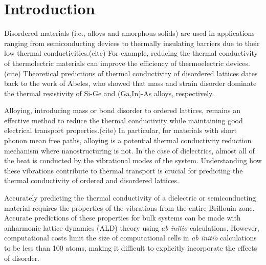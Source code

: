 \documentclass[aps,prb,onecolumn,preprint,superscriptaddress,amsmath,amssymb,floatfix]{revtex4}
\begin{document}
\section{\label{S:Introduction}Introduction}

Disordered materials (i.e., alloys and amorphous solids) are used in 
applications ranging from semiconducting devices to thermally insulating  
barriers due to their low thermal conductivities.(cite) 
For example, reducing 
the thermal conductivity of thermolectric materials can improve the 
efficiency of thermoelectric devices.(cite)  
Theoretical predictions of thermal conductivity of disordered 
lattices dates back to 
the work of Abeles, who showed that mass and strain 
disorder dominate the thermal resistivity of Si-Ge and 
(Ga,In)-As alloys, respectively.\cite{abeles_lattice_1963} 

Alloying, introducing mass or bond disorder to ordered lattices, 
remains an effective method to reduce the thermal conductivity 
while maintaining good electrical transport properties.(cite) 
In particular, for materials with short phonon mean free paths, 
alloying is a potential thermal conductivity reduction 
mechanism where nanostructuring is not.
\cite{qiu_molecular_2012,tian_phonon_2012} 
In the case of dielectrics, almost all of the heat is conducted by
the vibrational modes of the system. 
Understanding how these vibrations contribute to thermal transport 
is crucial for predicting the 
thermal conductivity of ordered and disordered lattices. 

Accurately predicting the thermal conductivity of a dielectric or 
semiconducting material requires the properties of the vibrations 
from the entire Brillouin zone.
\cite{ziman_electrons_2001,feldman_thermal_1993} 
Accurate predictions of these properties for bulk systems 
can be made with anharmonic lattice dynamics (ALD) theory 
using \emph{ab initio} 
calculations.\cite{ward_intrinsic_2010,lindsay_thermal_2012,
garg_role_2011,
shiga_microscopic_2012,tian_phonon_2012,
shiomi_thermal_2011,esfarjani_heat_2011}
However, computational costs limit the size of computational cells 
in \emph{ab initio} calculations to be less than 100 atoms, 
making it difficult to explicitly incorporate the effects of disorder.
\cite{koker_thermal_2009,bao_first-principles_2012,
lindsay_thermal_2012,tian_phonon_2012,garg_role_2011}
\end{document}
